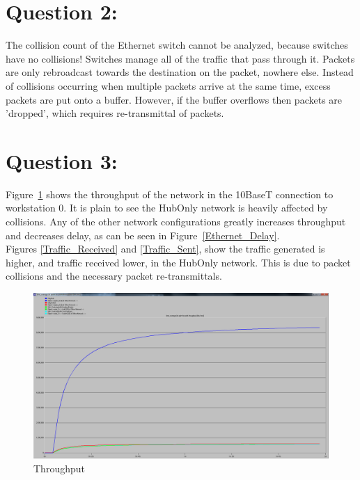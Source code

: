 \documentclass[letter,12pt]{article}
\begin{document}
\pagebreak

\section{Question 2:}
	The collision count of the Ethernet switch cannot be analyzed, because switches have no collisions! Switches manage all of the traffic that pass through it.  Packets are only rebroadcast towards the destination on the packet, nowhere else.  Instead of collisions occurring when multiple packets arrive at the same time, excess packets are put onto a buffer.  However, if the buffer overflows then packets are 'dropped', which requires re-transmittal of packets.

\section{Question 3:}
	Figure~\ref{Throughput} shows the throughput of the network in the 10BaseT connection to workstation 0. It is plain to see the HubOnly network is heavily affected by collisions.  Any of the other network configurations greatly increases throughput and decreases delay, as can be seen in Figure~\ref{Ethernet_Delay}. \\
	
	\noindent Figures \ref{Traffic_Received} and \ref{Traffic_Sent}, show the traffic generated is higher, and traffic received lower, in the HubOnly network. This is due to packet collisions and the necessary packet re-transmittals.
	
	\begin{figure}[h!]
		\centering
		\includegraphics[width=\linewidth]{Throughput.png}
		\caption{Throughput}
		\label{Throughput}
	\end{figure}
	
\end{document}
